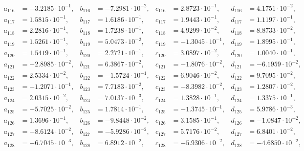 \begin{align*}
  a_{ 116 } &= -3.2185 \cdot 10^{ -1 }, & b_{ 116 } &= -7.2981 \cdot 10^{ -2 }, & c_{ 116 } &= 2.8723 \cdot 10^{ -1 }, & d_{ 116 } &= 4.1751 \cdot 10^{ -2 }, \\ 
  a_{ 117 } &= 1.5815 \cdot 10^{ -1 }, & b_{ 117 } &= 1.6186 \cdot 10^{ -1 }, & c_{ 117 } &= 1.9443 \cdot 10^{ -1 }, & d_{ 117 } &= 1.1197 \cdot 10^{ -1 }, \\ 
  a_{ 118 } &= 2.2816 \cdot 10^{ -1 }, & b_{ 118 } &= 1.7238 \cdot 10^{ -1 }, & c_{ 118 } &= 4.9299 \cdot 10^{ -2 }, & d_{ 118 } &= 8.8733 \cdot 10^{ -2 }, \\ 
  a_{ 119 } &= 1.5261 \cdot 10^{ -1 }, & b_{ 119 } &= 5.0473 \cdot 10^{ -2 }, & c_{ 119 } &= -1.3045 \cdot 10^{ -1 }, & d_{ 119 } &= 1.8995 \cdot 10^{ -1 }, \\ 
  a_{ 120 } &= 1.5419 \cdot 10^{ -1 }, & b_{ 120 } &= 2.2721 \cdot 10^{ -1 }, & c_{ 120 } &= 3.0897 \cdot 10^{ -2 }, & d_{ 120 } &= 1.0040 \cdot 10^{ -1 }, \\ 
  a_{ 121 } &= -2.8985 \cdot 10^{ -2 }, & b_{ 121 } &= 6.3867 \cdot 10^{ -2 }, & c_{ 121 } &= -1.8076 \cdot 10^{ -2 }, & d_{ 121 } &= -6.1959 \cdot 10^{ -2 }, \\ 
  a_{ 122 } &= 2.5334 \cdot 10^{ -2 }, & b_{ 122 } &= -1.5724 \cdot 10^{ -1 }, & c_{ 122 } &= 6.9046 \cdot 10^{ -2 }, & d_{ 122 } &= 9.7095 \cdot 10^{ -2 }, \\ 
  a_{ 123 } &= -1.2071 \cdot 10^{ -1 }, & b_{ 123 } &= 7.7183 \cdot 10^{ -2 }, & c_{ 123 } &= -8.3982 \cdot 10^{ -2 }, & d_{ 123 } &= 1.2807 \cdot 10^{ -2 }, \\ 
  a_{ 124 } &= 2.0315 \cdot 10^{ -2 }, & b_{ 124 } &= 7.0137 \cdot 10^{ -3 }, & c_{ 124 } &= 1.3828 \cdot 10^{ -1 }, & d_{ 124 } &= 1.3375 \cdot 10^{ -1 }, \\ 
  a_{ 125 } &= -5.7025 \cdot 10^{ -2 }, & b_{ 125 } &= 1.7814 \cdot 10^{ -1 }, & c_{ 125 } &= -1.3745 \cdot 10^{ -1 }, & d_{ 125 } &= 5.9786 \cdot 10^{ -3 }, \\ 
  a_{ 126 } &= 1.3696 \cdot 10^{ -1 }, & b_{ 126 } &= -9.8448 \cdot 10^{ -2 }, & c_{ 126 } &= 3.1585 \cdot 10^{ -1 }, & d_{ 126 } &= -1.0847 \cdot 10^{ -2 }, \\ 
  a_{ 127 } &= -8.6124 \cdot 10^{ -2 }, & b_{ 127 } &= -5.9286 \cdot 10^{ -2 }, & c_{ 127 } &= 5.7176 \cdot 10^{ -2 }, & d_{ 127 } &= 6.8401 \cdot 10^{ -2 }, \\ 
  a_{ 128 } &= -6.7045 \cdot 10^{ -3 }, & b_{ 128 } &= 6.8912 \cdot 10^{ -2 }, & c_{ 128 } &= -5.9306 \cdot 10^{ -2 }, & d_{ 128 } &= -4.6850 \cdot 10^{ -2 }, \\ 

\end{align*}
